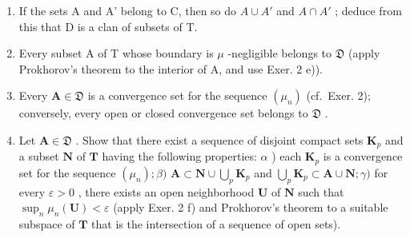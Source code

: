 \begin{enumerate}
\def\labelenumi{\alph{enumi})}
\item
  If the sets A and A' belong to C, then so do \(A \cup A'\) and \(A \cap A'\) ; deduce from this that D is a clan of subsets of T.
\item
  Every subset A of T whose boundary is \(\mu\) -negligible belongs to \(\mathfrak{D}\) (apply Prokhorov's theorem to the interior of A, and use Exer. 2 e)).
\item
  Every \(\mathbf{A} \in \mathfrak{D}\) is a convergence set for the sequence \((\mu_n)\) (cf.~Exer. 2); conversely, every open or closed convergence set belongs to \(\mathfrak{D}\) .
\item
  Let \(\mathbf{A} \in \mathfrak{D}\) . Show that there exist a sequence of disjoint compact sets \(\mathbf{K}_p\) and a subset \(\mathbf{N}\) of \(\mathbf{T}\) having the following properties: \(\alpha\) ) each \(\mathbf{K}_p\) is a convergence set for the sequence \((\mu_n); \beta)\) \(\mathbf{A} \subset \mathbf{N} \cup \bigcup_{p} \mathbf{K}_p\) and \(\bigcup_{p} \mathbf{K}_p \subset \mathbf{A} \cup \mathbf{N}; \gamma)\) for every \(\varepsilon > 0\) , there exists an open neighborhood \(\mathbf{U}\) of \(\mathbf{N}\) such that \(\sup_{n}\mu_n(\mathbf{U}) < \varepsilon\) (apply Exer. 2 f) and Prokhorov's theorem to a suitable subspace of \(\mathbf{T}\) that is the intersection of a sequence of open sets).
\end{enumerate}

